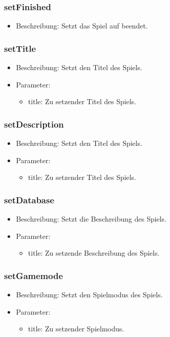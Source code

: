 \documentclass[a4paper]{scrreprt}
\begin{document}
	\subsubsection{setFinished}
	\begin{itemize}
		\item Beschreibung: Setzt das Spiel auf beendet.
	\end{itemize}

	\subsubsection{setTitle}
	\begin{itemize}
		\item Beschreibung: Setzt den Titel des Spiels.
		\item Parameter:
		\begin{itemize}
			\item title: Zu setzender Titel des Spiels.
		\end{itemize}
	\end{itemize}

	\subsubsection{setDescription}
	\begin{itemize}
		\item Beschreibung: Setzt den Titel des Spiels.
		\item Parameter:
		\begin{itemize}
			\item title: Zu setzender Titel des Spiels.
		\end{itemize}
	\end{itemize}

	\subsubsection{setDatabase}
	\begin{itemize}
		\item Beschreibung: Setzt die Beschreibung des Spiels.
		\item Parameter:
		\begin{itemize}
			\item title: Zu setzende Beschreibung des Spiels.
		\end{itemize}
	\end{itemize}

	\subsubsection{setGamemode}
	\begin{itemize}
		\item Beschreibung: Setzt den Spielmodus des Spiels.
		\item Parameter:
		\begin{itemize}
			\item title: Zu setzender Spielmodus.
		\end{itemize}
	\end{itemize}
\end{document}
